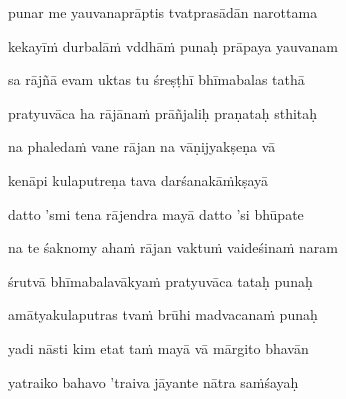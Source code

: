 punar me yauvanaprāptis tvatprasādān narottama\thinspace{\dandab} \dontdisplaylinenum

kekayīṁ durbalāṁ vddhāṁ punaḥ prāpaya yauvanam \veg\dontdisplaylinenum
{}

sa rājñā evam uktas tu śreṣṭhī bhīmabalas tathā\thinspace{\dandab} \dontdisplaylinenum

pratyuvāca ha rājānaṁ prāñjaliḥ praṇataḥ sthitaḥ \veg\dontdisplaylinenum
{}

na phaledaṁ vane rājan na vāṇijyakṣeṇa vā\thinspace{\dandab} \dontdisplaylinenum

kenāpi kulaputreṇa tava darśanakāṁkṣayā \veg\dontdisplaylinenum
{}

datto 'smi tena rājendra mayā datto 'si bhūpate\thinspace{\dandab} \dontdisplaylinenum

na te śaknomy ahaṁ rājan vaktuṁ vaideśinaṁ naram \veg\dontdisplaylinenum
{}

śrutvā bhīmabalavākyaṁ pratyuvāca tataḥ punaḥ\thinspace{\dandab} \dontdisplaylinenum

amātyakulaputras tvaṁ brūhi madvacanaṁ punaḥ \veg\dontdisplaylinenum
{}

yadi nāsti kim etat taṁ mayā vā mārgito bhavān\thinspace{\dandab} \dontdisplaylinenum

yatraiko bahavo 'traiva jāyante nātra saṁśayaḥ \veg\dontdisplaylinenum
{}

